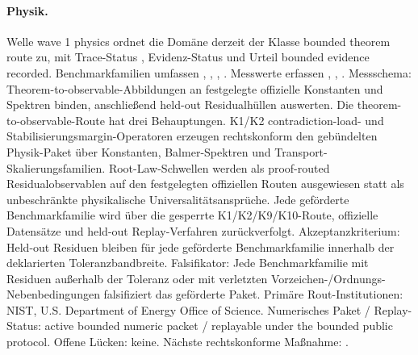 \paragraph{Physik.}
Welle wave 1 physics ordnet die Domäne derzeit der Klasse bounded theorem route zu, mit Trace-Status , Evidenz-Status  und Urteil bounded evidence recorded.
Benchmarkfamilien umfassen , \allowbreak {}, \allowbreak {}, \allowbreak {}.
Messwerte erfassen , \allowbreak {}, \allowbreak {}.
Messschema: Theorem-to-observable-Abbildungen an festgelegte offizielle Konstanten und Spektren binden, anschließend held-out Residualhüllen auswerten.
Die theorem-to-observable-Route hat drei Behauptungen. K1/K2 contradiction-load- und Stabilisierungsmargin-Operatoren erzeugen rechtskonform den gebündelten Physik-Paket über Konstanten, Balmer-Spektren und Transport-Skalierungsfamilien. Root-Law-Schwellen werden als proof-routed Residualobservablen auf den festgelegten offiziellen Routen ausgewiesen statt als unbeschränkte physikalische Universalitätsansprüche. Jede geförderte Benchmarkfamilie wird über die gesperrte K1/K2/K9/K10-Route, offizielle Datensätze und held-out Replay-Verfahren zurückverfolgt.
Akzeptanzkriterium: Held-out Residuen bleiben für jede geförderte Benchmarkfamilie innerhalb der deklarierten Toleranzbandbreite.
Falsifikator: Jede Benchmarkfamilie mit Residuen außerhalb der Toleranz oder mit verletzten Vorzeichen-/Ordnungs-Nebenbedingungen falsifiziert das geförderte Paket.
Primäre Rout-Institutionen: NIST, \allowbreak U.S. Department of Energy Office of Science.
Numerisches Paket / Replay-Status: active bounded numeric packet / replayable under the bounded public protocol.
Offene Lücken: keine.
Nächste rechtskonforme Maßnahme: .

